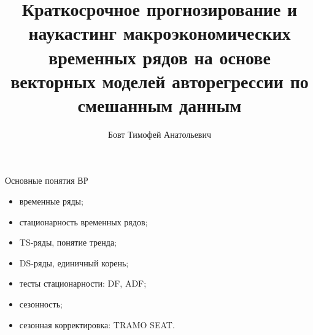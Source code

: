 \documentclass[notheorems, 10pt]{beamer}
\title[Модели по данным разной частоты]{\Large Краткосрочное прогнозирование и наукастинг макроэкономических временных рядов на основе векторных моделей авторегрессии по смешанным данным}
\author[Т. А. Бовт]{Бовт Тимофей Анатольевич}
\institute[]{Научный руководитель: В.И. Малюгин}
\date[]{}%
\begin{document}
\begin{frame}[plain]
  \titlepage
\end{frame}


\begin{frame}{Основные понятия ВР}
	\begin{itemize}
		\item временные ряды;
		\item стационарность временных рядов;
		\item TS-ряды, понятие тренда;
		\item DS-ряды, единичный корень;
		\item тесты стационарности: DF, ADF;
		\item сезонность;
		\item сезонная корректировка: TRAMO SEAT.
	\end{itemize}
\end{frame}

\end{document}
